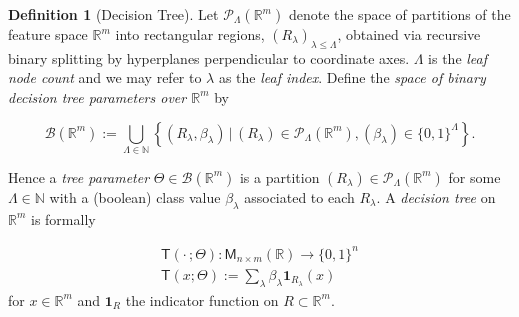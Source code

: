 \documentclass[11pt]{article}
\theoremstyle{definition}
\newtheorem{definition}{Definition}
\numberwithin{equation}{section}
\begin{document}
\begin{definition}[Decision Tree]\label{def:decision-tree}
Let $\mathcal{P}_\Lambda (\mathbb{R}^m)$ denote the space of partitions of the feature space $\mathbb{R}^m$ into rectangular regions, $(R_\lambda)_{\lambda \leq \Lambda}$, obtained via recursive binary splitting by hyperplanes perpendicular to coordinate axes. $\Lambda$ is the \emph{leaf node count} and we may refer to $\lambda$ as the \emph{leaf index}. Define the \emph{space of binary decision tree parameters over $\mathbb{R}^m$} by

\begin{equation}
  \mathcal{B} (\mathbb{R}^m):= \bigcup_{\Lambda \in \mathbb{N}} \left\{ (R_\lambda, \beta_\lambda) \, | \, (R_\lambda) \in \mathcal{P}_\Lambda (\mathbb{R}^m) , (\beta_\lambda) \in \{0, 1\}^\Lambda \right\}.
\end{equation}

Hence a \emph{tree parameter} $\Theta \in \mathcal{B} (\mathbb{R}^m)$ is a partition $(R_\lambda) \in \mathcal{P}_\Lambda (\mathbb{R}^m)$ for some $\Lambda \in \mathbb{N}$ with a (boolean) class value $\beta_\lambda$ associated to each $R_\lambda$. %
A \emph{decision tree} on $\mathbb{R}^m$ is formally

\begin{equation}\label{eq:decision-tree}
\begin{gathered}
  \mathsf{T} (\cdot\, ; \Theta): \mathsf{M}_{n \times m} (\mathbb{R}) \rightarrow \{0, 1\}^n  \\
  \mathsf{T} (x; \Theta) := \sum_\lambda \beta_\lambda \mathbf{1}_{R_\lambda} (x) 
\end{gathered}  
\end{equation}
for $x \in \mathbb{R}^m$ and $\mathbf{1}_R$ the indicator function on $R \subset \mathbb{R}^m$.
\end{definition}
\end{document}
